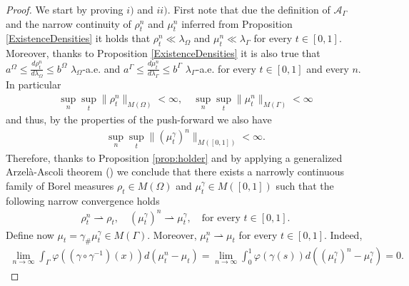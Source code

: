 \documentclass{article}
\begin{document}
\begin{proof}
We start by proving $i)$ and $ii)$. First note that due the definition of $\mathcal{A}_\Gamma$ and the narrow continuity of $\rho^n_t$ and $\mu^n_t$ inferred from Proposition \ref{ExistenceDensities} it holds that $\rho_t^n \ll \lambda_{\Omega}$ and $\mu_t^n \ll \lambda_{\Gamma}$ for every $t\in [0,1]$. Moreover, thanks to Proposition \ref{ExistenceDensities} it is also true that $a^\Omega \le \frac{d\rho^n_t}{d\lambda_\Omega} \le b^\Omega$ $\lambda_\Omega$-a.e. and $a^\Gamma \le \frac{d\mu^n_t} {d\lambda_\Gamma} \le  b^\Gamma$ $\lambda_\Gamma$-a.e. for every $t \in [0,1]$ and every $n$. In particular
    \begin{align}
        \sup_n\sup_t \|\rho_t^n\|_{M(\Omega)} < \infty, \quad \sup_n\sup_t \|\mu_t^n\|_{M(\Gamma)} < \infty
    \end{align}
    and thus, by the properties of the push-forward we also have
    \begin{align}
       \sup_n\sup_t \|(\mu_t^\gamma)^n\|_{M([0,1])} < \infty.
    \end{align}
     Therefore, thanks to Proposition \ref{prop:holder} and by applying a generalized Arzelà-Ascoli theorem (\cite[Proposition A.4]{bredies2020optimal}) we conclude that there exists a narrowly continuous family of Borel measures $\rho_t \in M(\Omega)$ and $\mu^\gamma_t \in M([0,1])$ such that the following narrow convergence holds
     \begin{align}\label{eq:convpu}
        \rho^n_t \rightharpoonup \rho_t, \quad (\mu^\gamma_t)^n \rightharpoonup \mu^\gamma_t, \quad \text{for every } t \in [0,1]. 
     \end{align}
     Define now $\mu_t = \gamma_\# \mu^\gamma_t \in M(\Gamma)$. Moreover, $\mu_t^n \rightharpoonup \mu_t$ for every $t \in [0,1]$. Indeed,
     \begin{align*}
         \lim_{n\to\infty} \int_\Gamma \varphi((\gamma \circ \gamma^{-1})(x)) d(\mu^n_t - \mu_t) = \lim_{n\to\infty}\int_0^1 \varphi(\gamma(s))d((\mu^\gamma_t)^n - \mu^\gamma_t) = 0.  
     \end{align*}
     

\end{proof}
\end{document}
